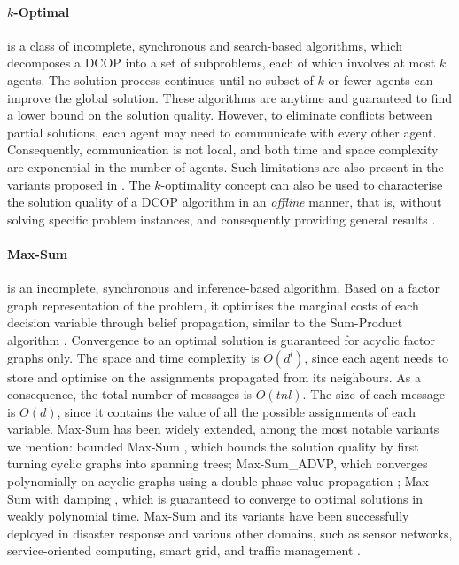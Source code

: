 \paragraph{$k$-Optimal}

\cite{pearce2007} is a class of incomplete, synchronous and search-based algorithms, which
decomposes a DCOP into a set of subproblems, each of which involves at most $k$ agents.
The solution process continues until no subset of $k$ or fewer agents can improve the
global solution. These algorithms are anytime and guaranteed to find a lower bound on the
solution quality. However, to eliminate conflicts between partial solutions, each agent
may need to communicate with every other agent. Consequently, communication is not local,
and both time and space complexity are exponential in the number of agents. Such
limitations are also present in the variants proposed in
\cite{kiekintveld2010,vinyals2011}. The $k$-optimality concept can also be used to
characterise the solution quality of a DCOP algorithm in an \emph{offline} manner, that
is, without solving specific problem instances, and consequently providing general results
\cite{farinelli2013dcop}.

\paragraph{Max-Sum}

\cite{farinelli2008} is an incomplete, synchronous and inference-based algorithm. Based
on a factor graph representation of the problem, it optimises the marginal costs of each
decision variable through belief propagation, similar to the Sum-Product algorithm
\cite{kschischang2001}. Convergence to an optimal solution is guaranteed for acyclic
factor graphs only.
The space and time complexity is $O(d^l)$, since each agent needs to store and optimise on
the assignments propagated from its neighbours. As a consequence, the total number of
messages is $O(tnl)$. The size of each message is $O(d)$, since it contains the value of
all the possible assignments of each variable. Max-Sum has been widely extended, among the
most notable variants we mention: bounded Max-Sum \cite{rogers2011,rollon2012}, which
bounds the solution quality by first turning cyclic graphs into spanning trees;
Max-Sum\_ADVP, which converges polynomially on acyclic graphs using a double-phase value
propagation \cite{zivan2012,chen2017}; Max-Sum with damping \cite{cohen2017}, which is
guaranteed to converge to optimal solutions in weakly polynomial time. Max-Sum and its
variants have been successfully deployed in disaster response
\cite{ramchurn2015b,ramchurn2015c,ramchurn2016,dellefave2010,dellefave2012a,dellefave2012b,stranders2010,pujol2018,stranders2009,yedidsion2018}
and various other domains, such as sensor networks, service-oriented computing, smart
grid, and traffic management \cite{fioretto2018survey}.

